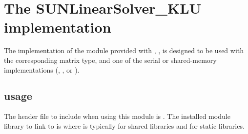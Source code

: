 \section{The SUNLinearSolver\_KLU implementation}\label{ss:sunlinsol_klu}

The {\klu} implementation of the {\sunlinsol} module provided with
{\sundials}, {\sunlinsolklu}, is designed to be used with the
corresponding {\sunmatsparse} matrix type, and one of the serial or
shared-memory {\nvector} implementations ({\nvecs}, {\nvecopenmp}, or 
{\nvecpthreads}).


\subsection{{\sunlinsolklu} usage}\label{ss:sunlinsol_klu_usage}

The header file to include when using this module 
is . The installed module
library to link to is
where  is typically  for shared libraries and
 for static libraries. 

